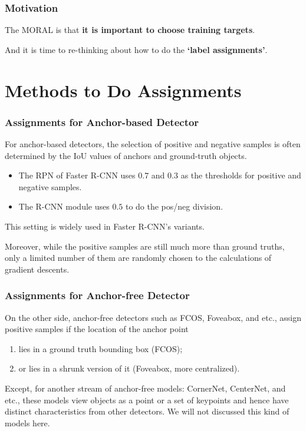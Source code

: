 \documentclass[slidetop, mathserif, dvipsnames]{beamer}
\begin{document}
\begin{frame}
    \frametitle{Motivation}

    The MORAL is that {\bf it is important to choose training targets}.

    \quad 

    And it is time to re-thinking about
    how to do the {\bf `label assignments'}.

\end{frame}

\section{Methods to Do Assignments}

\begin{frame}
    \frametitle{Assignments for Anchor-based Detector}

    For anchor-based detectors, the selection of positive and negative samples
    is often determined by the IoU values of anchors and ground-truth objects.

    \begin{itemize}
    \item The RPN of Faster R-CNN uses $0.7$ and $0.3$ as the thresholds for positive
        and negative samples.
    \item The R-CNN module uses $0.5$ to do the pos/neg division.
    \end{itemize}
    This setting is widely used in Faster R-CNN's variants.

    \quad

    Moreover, while the positive samples are still much more than ground truths,
    only a limited number of them are randomly chosen to the calculations of
    gradient descents.

\end{frame}

\begin{frame}
    \frametitle{Assignments for Anchor-free Detector}

    On the other side, anchor-free detectors such as FCOS, Foveabox, and etc.,
    assign positive samples if the location of the anchor point 
    \begin{enumerate}
    \item lies in a ground truth bounding box (FCOS);
    \item or lies in a shrunk version of it (Foveabox, more centralized).
    \end{enumerate}

    \quad

    Except, for another stream of anchor-free models:
    CornerNet, CenterNet, and etc., these models view objects as a point or
    a set of keypoints and hence have distinct characteristics from other
    detectors. We will not discussed this kind of models here.
    
\end{frame}
\end{document}
